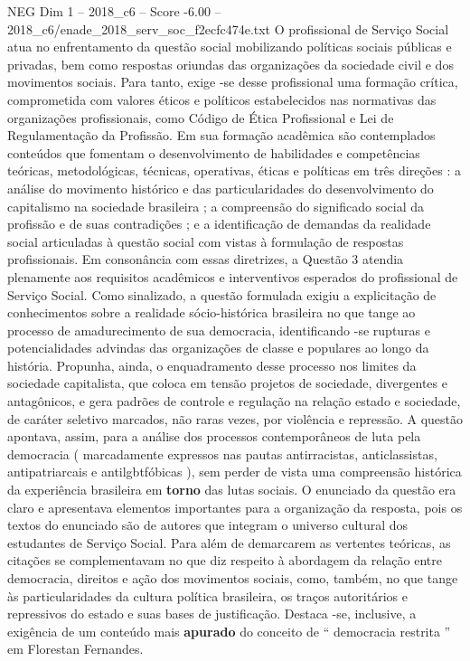 \begin{textsample}{NEG Dim 1 – 2018\_c6 – Score -6.00 – 2018\_c6/enade\_2018\_serv\_soc\_f2ecfc474e.txt}
O profissional de Serviço Social atua no enfrentamento da questão social mobilizando políticas sociais públicas e privadas, bem como respostas oriundas das organizações da sociedade civil e dos movimentos sociais.
Para tanto, exige -se desse profissional uma formação crítica, comprometida com valores éticos e políticos estabelecidos nas normativas das organizações profissionais, como Código de Ética Profissional e Lei de Regulamentação da Profissão.
Em sua formação acadêmica são contemplados conteúdos que fomentam o desenvolvimento de habilidades e competências teóricas, metodológicas, técnicas, operativas, éticas e políticas em três direções : a análise do movimento histórico e das particularidades do desenvolvimento do capitalismo na sociedade brasileira ; a compreensão do significado social da profissão e de suas contradições ; e a identificação de demandas da realidade social articuladas à questão social com vistas à formulação de respostas profissionais.
Em consonância com essas diretrizes, a Questão 3 atendia plenamente aos requisitos acadêmicos e interventivos esperados do profissional de Serviço Social.
Como sinalizado, a questão formulada exigiu a explicitação de conhecimentos sobre a realidade sócio-histórica brasileira no que tange ao processo de amadurecimento de sua democracia, identificando -se rupturas e potencialidades advindas das organizações de classe e populares ao longo da história.
Propunha, ainda, o enquadramento desse processo nos limites da sociedade capitalista, que coloca em tensão projetos de sociedade, divergentes e antagônicos, e gera padrões de controle e regulação na relação estado e sociedade, de caráter seletivo marcados, não raras vezes, por violência e repressão.
A questão apontava, assim, para a análise dos processos contemporâneos de luta pela democracia ( marcadamente expressos nas pautas antirracistas, anticlassistas, antipatriarcais e antilgbtfóbicas ), sem perder de vista uma compreensão histórica da experiência brasileira em \textbf{torno} das lutas sociais.
O enunciado da questão era claro e apresentava elementos importantes para a organização da resposta, pois os textos do enunciado são de autores que integram o universo cultural dos estudantes de Serviço Social.
Para além de demarcarem as vertentes teóricas, as citações se complementavam no que diz respeito à abordagem da relação entre democracia, direitos e ação dos movimentos sociais, como, também, no que tange às particularidades da cultura política brasileira, os traços autoritários e repressivos do estado e suas bases de justificação.
Destaca -se, inclusive, a exigência de um conteúdo mais \textbf{apurado} do conceito de “ democracia restrita ” em Florestan Fernandes.

\end{textsample}
